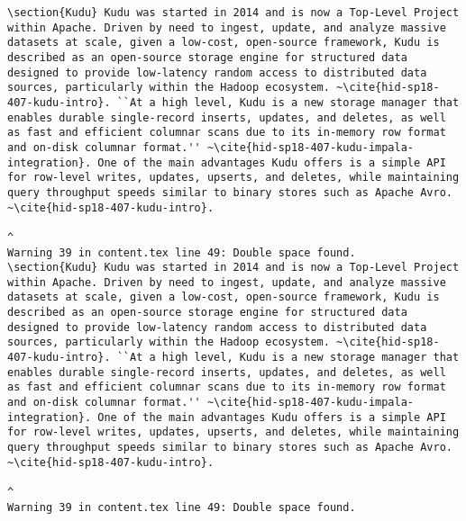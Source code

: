 \begin{tiny}
\begin{verbatim}
\section{Kudu} Kudu was started in 2014 and is now a Top-Level Project within Apache. Driven by need to ingest, update, and analyze massive datasets at scale, given a low-cost, open-source framework, Kudu is described as an open-source storage engine for structured data designed to provide low-latency random access to distributed data sources, particularly within the Hadoop ecosystem. ~\cite{hid-sp18-407-kudu-intro}. ``At a high level, Kudu is a new storage manager that enables durable single-record inserts, updates, and deletes, as well as fast and efficient columnar scans due to its in-memory row format and on-disk columnar format.'' ~\cite{hid-sp18-407-kudu-impala-integration}. One of the main advantages Kudu offers is a simple API for row-level writes, updates, upserts, and deletes, while maintaining query throughput speeds similar to binary stores such as Apache Avro. ~\cite{hid-sp18-407-kudu-intro}.  
                                                                                                                                                                                                                                                                                                                                                                                                   ^
Warning 39 in content.tex line 49: Double space found.
\section{Kudu} Kudu was started in 2014 and is now a Top-Level Project within Apache. Driven by need to ingest, update, and analyze massive datasets at scale, given a low-cost, open-source framework, Kudu is described as an open-source storage engine for structured data designed to provide low-latency random access to distributed data sources, particularly within the Hadoop ecosystem. ~\cite{hid-sp18-407-kudu-intro}. ``At a high level, Kudu is a new storage manager that enables durable single-record inserts, updates, and deletes, as well as fast and efficient columnar scans due to its in-memory row format and on-disk columnar format.'' ~\cite{hid-sp18-407-kudu-impala-integration}. One of the main advantages Kudu offers is a simple API for row-level writes, updates, upserts, and deletes, while maintaining query throughput speeds similar to binary stores such as Apache Avro. ~\cite{hid-sp18-407-kudu-intro}.  
                                                                                                                                                                                                                                                                                                                                                                                                                                                                                                                                                                                                                                                                   ^
Warning 39 in content.tex line 49: Double space found.

\end{verbatim}
\end{tiny}

